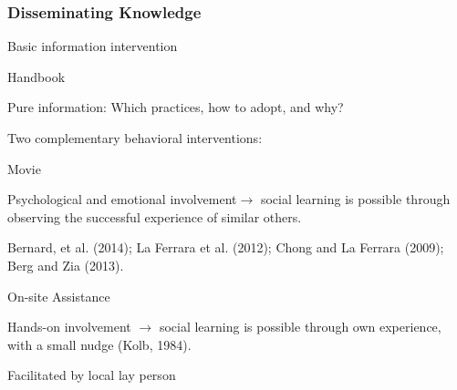 \documentclass[hideothersubsections, usenames,dvipsnames,11pt]{beamer}
\newenvironment{itemize_2pt}{\itemize\addtolength{\itemsep}{2pt}}{\enditemize}
\begin{document}
\begin{frame}
\frametitle{Disseminating Knowledge}

	Basic information intervention
	\begin{itemize_2pt}
		\item \textcolor{bdf}{Handbook}
		\begin{itemize_2pt}
			\item \textcolor{bdf}{Pure information}: Which practices, how to adopt, and why?\\
		\end{itemize_2pt}
	\end{itemize_2pt}
	
	\vspace{1.0em}

	Two complementary behavioral interventions:
	\begin{itemize_2pt}
		\item \textcolor{bdf}{Movie}
		\begin{itemize_2pt}
			\item \textcolor{bdf}{Psychological and emotional involvement}$\rightarrow$ social learning is possible through \textcolor{bdf}{observing the successful experience of similar others}.
			\item Bernard, et al. (2014); La Ferrara et al. (2012); Chong and La Ferrara (2009); Berg and Zia (2013).\\
		\end{itemize_2pt}

		\item \textcolor{bdf}{On-site Assistance}
			\begin{itemize_2pt}
				\item \textcolor{bdf}{Hands-on involvement} $\rightarrow$ social learning is possible through own \textcolor{bdf}{experience, 					with a small nudge} (Kolb, 1984).
				\item Facilitated by local lay person
			\end{itemize_2pt}


	\end{itemize_2pt}

\end{frame}
\end{document}
